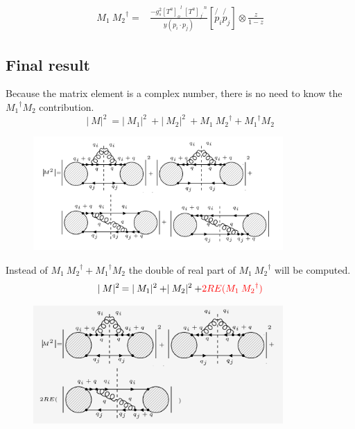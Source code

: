 \begin{equation}
\begin{split}
M_1\: {M_2}^{\dagger} =& \frac{-g_s^2 {[T^a]_o}^l \:{[T^a]_{f^{\prime}}}^n }{y(p_i \cdot p_j)} [\not{p_i}\not{p_j}]\otimes\frac{z}{1-z}
\end{split}
\end{equation}









\pagebreak

\subsection{Final result}
\label{fin}
Because the matrix element is a complex number, there is no need to know the $ {M_1}^{\dagger} M_2 $ contribution.
\begin{equation}
\lvert\:M\lvert^2\: = \lvert\:M_1\lvert^2\:+\lvert\:M_2\lvert^2\:+ M_1\: {M_2}^{\dagger} +{M_1}^{\dagger} M_2
\end{equation}
\begin{figure}[h!]
\centering
\includegraphics[width=0.85\textwidth]{images/QQ/qqgMSquer.png}
\end{figure}
Instead of $ M_1\: {M_2}^{\dagger} +{M_1}^{\dagger} M_2 $ the double of real part of $M_1\: {M_2}^{\dagger}$ will be computed.
\begin{equation}
\lvert\:M\lvert^2\: = \lvert\:M_1\lvert^2\:+\lvert\:M_2\lvert^2\:+ {\color[RGB]{255,0,0} 2RE(M_1\: {M_2}^{\dagger})}
\end{equation}
\begin{figure}[h!]
\centering
\includegraphics[width=0.85\textwidth]{images/QQ/REqqgMSquer.png}
\end{figure}
